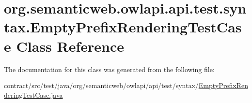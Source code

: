 \hypertarget{classorg_1_1semanticweb_1_1owlapi_1_1api_1_1test_1_1syntax_1_1_empty_prefix_rendering_test_case}{\section{org.\-semanticweb.\-owlapi.\-api.\-test.\-syntax.\-Empty\-Prefix\-Rendering\-Test\-Case Class Reference}
\label{classorg_1_1semanticweb_1_1owlapi_1_1api_1_1test_1_1syntax_1_1_empty_prefix_rendering_test_case}
}


The documentation for this class was generated from the following file\-:\begin{DoxyCompactItemize}
\item 
contract/src/test/java/org/semanticweb/owlapi/api/test/syntax/\hyperlink{_empty_prefix_rendering_test_case_8java}{Empty\-Prefix\-Rendering\-Test\-Case.\-java}\end{DoxyCompactItemize}
